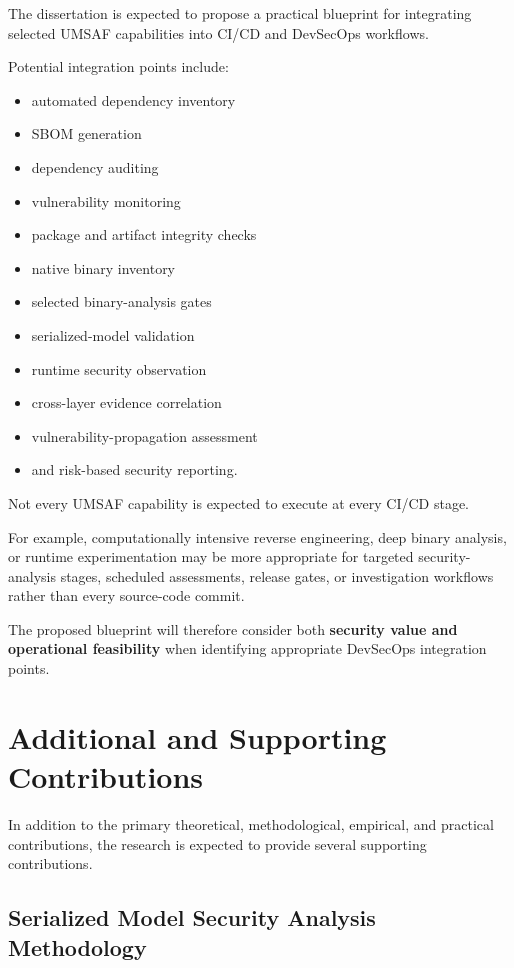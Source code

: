 \documentclass[
  12pt,
  letterpaper,
  oneside]{report}
\providecommand{\tightlist}{%
  \setlength{\itemsep}{0pt}\setlength{\parskip}{0pt}}
\begin{document}
The dissertation is expected to propose a practical blueprint for
integrating selected UMSAF capabilities into CI/CD and DevSecOps
workflows.

Potential integration points include:

\begin{itemize}
\tightlist
\item
  automated dependency inventory
\item
  SBOM generation
\item
  dependency auditing
\item
  vulnerability monitoring
\item
  package and artifact integrity checks
\item
  native binary inventory
\item
  selected binary-analysis gates
\item
  serialized-model validation
\item
  runtime security observation
\item
  cross-layer evidence correlation
\item
  vulnerability-propagation assessment
\item
  and risk-based security reporting.
\end{itemize}

Not every UMSAF capability is expected to execute at every CI/CD stage.

For example, computationally intensive reverse engineering, deep binary
analysis, or runtime experimentation may be more appropriate for
targeted security-analysis stages, scheduled assessments, release gates,
or investigation workflows rather than every source-code commit.

The proposed blueprint will therefore consider both \textbf{security
value and operational feasibility} when identifying appropriate
DevSecOps integration points.

\section{Additional and Supporting Contributions}\label{125-additional-and-supporting-contributions}

In addition to the primary theoretical, methodological, empirical, and
practical contributions, the research is expected to provide several
supporting contributions.

\subsection{Serialized Model Security Analysis Methodology}\label{1251-serialized-model-security-analysis-methodology}
\end{document}

